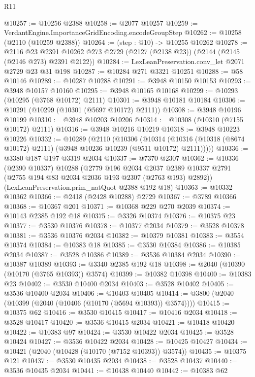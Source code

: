 \begin{lexlean}{R11}
\begin{coremodule}
@10257 := @10256 @2388
@10258 := @2077 @10257
@10259 := VerdantEngine.ImportanceGridEncoding.encodeGroupStep
@10262 := @10258 (@2110 (@10259 @2388))
@10264 := (step : @10) -> @10255 @10262
@10278 := @2116
    @23
    @2391
    @10262
    @273
    @2729
    (@2127 (@2138 @23))
    (@2144 (@2145 (@2146 @273) @2391 @2122))
@10284 := LexLeanPreservation.conv_let @2071 @2729 @23 @31 @198
@10287 := @10284 @271 @3321 @10251
@10288 := @58 @10146
@10289 := @10287 @10288
@10291 := @3948 @10150 @10153
@10293 := @3948 @10157 @10160
@10295 := @3948 @10165 @10168
@10299 := @10293 (@10295 (@3768 @10172) @2111)
@10301 := @3948 @10181 @10184
@10306 := @10291 (@10299 (@10301 (@5697 @10172) @2111))
@10308 := @3948 @10196 @10199
@10310 := @3948 @10203 @10206
@10314 := @10308 (@10310 (@7155 @10172) @2111)
@10316 := @3948 @10216 @10219
@10318 := @3948 @10223 @10226
@10332 := @10289
    (@2110
      (@10306
        (@10314 (@10316 (@10318 (@8674 @10172) @2111) (@3948 @10236 @10239 (@9511 @10172) @2111)))))
@10336 := @3380 @187 @197 @3319 @2034
@10337 := @7370 @2307
@10362 := @10336
    (@2390 @10337)
    @10288
    (@2779
      @196
      @2034
      @2037
      @2389
      @10337
      @2791
      (@2755 @194 @83 @2034 @2036 @193 @2307 (@2763 @193) @2892))
    (LexLeanPreservation.prim_natQuot @2388 @192 @18)
@10363 := @10332 @10362
@10366 := @2418 (@2428 @10288) @2729
@10367 := @3789 @10366
@10368 := @10367 @201
@10371 := @10368 @229 @270 @2039
@10374 := @10143 @2385 @192 @18
@10375 := @3326 @10374
@10376 := @10375 @23
@10377 := @3530 @10376
@10378 := @10377 @2034
@10379 := @3528 @10378
@10381 := @3536 @10376 @2034
@10382 := @10379 @10381
@10383 := @3554 @10374
@10384 := @10383 @18
@10385 := @3530 @10384
@10386 := @10385 @2034
@10387 := @3528 @10386
@10389 := @3536 @10384 @2034
@10390 := @10387 @10389
@10393 := @3340 @2385 @192 @18
@10398 := @2040 (@10390 (@10170 (@3765 @10393)) @3574)
@10399 := @10382 @10398
@10400 := @10383 @23
@10402 := @3530 @10400 @2034
@10403 := @3528 @10402
@10405 := @3536 @10400 @2034
@10406 := @10403 @10405
@10414 := @3800 (@2040 (@10399 (@2040 (@10406 (@10170 (@5694 @10393)) @3574))))
@10415 := @10375 @62
@10416 := @3530 @10415
@10417 := @10416 @2034
@10418 := @3528 @10417
@10420 := @3536 @10415 @2034
@10421 := @10418 @10420
@10422 := @10383 @97
@10424 := @3530 @10422 @2034
@10425 := @3528 @10424
@10427 := @3536 @10422 @2034
@10428 := @10425 @10427
@10434 := @10421 (@2040 (@10428 (@10170 (@7152 @10393)) @3574))
@10435 := @10375 @121
@10437 := @3530 @10435 @2034
@10438 := @3528 @10437
@10440 := @3536 @10435 @2034
@10441 := @10438 @10440
@10442 := @10383 @62

\end{coremodule}
\end{lexlean}
